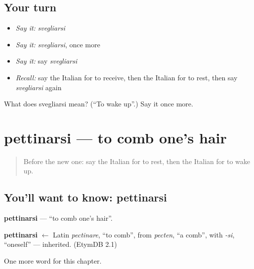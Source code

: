 \subsection*{Your turn}
\begin{itemize}
\raggedright
  \item \emph{Say it:} \emph{svegliarsi}
  \item \emph{Say it:} \emph{svegliarsi}, once more
  \item \emph{Say it:} say \emph{svegliarsi}
  \item \emph{Recall:} say the Italian for to receive, then the Italian for to rest, then say \emph{svegliarsi} again
\end{itemize}

\begin{tcolorbox}[breakable,colback=teal!4,colframe=teal!35!black,title={Before you move on}]
What does svegliarsi mean? (\textquotedblleft{}To wake up\textquotedblright{}.) Say it once more.
\end{tcolorbox}
\section[pettinarsi]{pettinarsi — to comb one's hair}

\label{lesson:IT-C236-pettinarsi}



\begin{quote}
Before the new one: say the Italian for to rest, then the Italian for to wake up.
\end{quote}

\subsection*{You'll want to know: pettinarsi}
\textbf{pettinarsi} — \textquotedblleft{}to comb one's hair\textquotedblright{}.

\begin{cousinweb}
\textbf{pettinarsi} $\leftarrow$ Latin \emph{pectinare}, \textquotedblleft{}to comb\textquotedblright{}, from \emph{pecten}, \textquotedblleft{}a comb\textquotedblright{}, with \emph{-si}, \textquotedblleft{}oneself\textquotedblright{} — inherited. (EtymDB 2.1)
\end{cousinweb}

\begin{grammarlens}[title={What you've built}]
One more word for this chapter.
\end{grammarlens}

